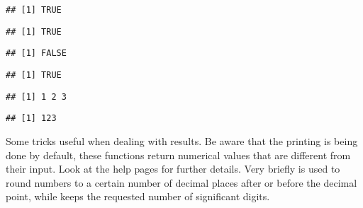 \documentclass[paper=a4,headsepline,BCOR=12mm,twoside,open=right,%
titlepage,headings=small,fontsize=10pt,index=totoc,bibliography=totoc,%
captions=tableheading,captions=nooneline]{scrbook}\usepackage{knitr}
\begin{document}
\begin{knitrout}
\begin{kframe}
\begin{alltt}
\hlstd{(}\hlstd{)}
\end{alltt}
\begin{verbatim}
## [1] TRUE
\end{verbatim}
\begin{alltt}
\hlstd{(}\hlstd{)}
\end{alltt}
\begin{verbatim}
## [1] TRUE
\end{verbatim}
\begin{alltt}
\hlstd{(}\hlstd{)}
\end{alltt}
\begin{verbatim}
## [1] FALSE
\end{verbatim}
\begin{alltt}
\hlstd{(}\hlopt{-}\hlstd{)}
\end{alltt}
\begin{verbatim}
## [1] TRUE
\end{verbatim}
\end{kframe}
\end{knitrout}

\begin{knitrout}\footnotesize
{}\color{fgcolor}\begin{kframe}
\begin{alltt}
 \hlkwb{<-} \hlstd{(}\hlstd{,} \hlstd{,} \hlstd{)}
 \hlkwb{<-} 
\end{alltt}
\begin{verbatim}
## [1] 1 2 3
\end{verbatim}
\begin{alltt}
\end{alltt}
\begin{verbatim}
## [1] 123
\end{verbatim}
\end{kframe}
\end{knitrout}

Some tricks useful when dealing with results. Be aware that the printing is being done by default, these functions return numerical values that are different from their input. Look at the help pages for further details. Very briefly  is used to round numbers to a certain number of decimal places after or before the decimal point, while  keeps the requested number of significant digits.
\end{document}
